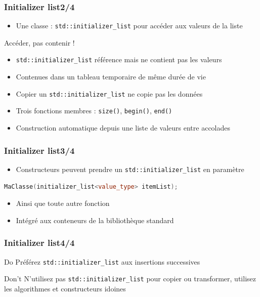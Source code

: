 \documentclass[C++.tex]{subfiles}
\begin{document}
\begin{frame}[fragile]
	\frametitle{Initializer list\titlehfill{}2/4}
	\begin{itemize}
		\item Une classe : \lstinline|std::initializer_list| pour accéder aux valeurs de la liste
	\end{itemize}

	\begin{alertblock}{Accéder, pas contenir !}
		\begin{itemize}
			\item \lstinline|std::initializer_list| référence mais ne contient pas les valeurs
			\item Contenues dans un tableau temporaire de même durée de vie
			\item Copier un \lstinline|std::initializer_list| ne copie pas les données
		\end{itemize}
	\end{alertblock}		

	\begin{itemize}
		\item Trois fonctions membres : \lstinline|size()|, \lstinline|begin()|, \lstinline|end()|
		\item Construction automatique depuis une liste de valeurs entre accolades
	\end{itemize}
\end{frame}

\begin{frame}[fragile]
	\frametitle{Initializer list\titlehfill{}3/4}
	\begin{itemize}
		\item Constructeurs peuvent prendre un \lstinline|std::initializer_list| en paramètre
	\end{itemize}

	\begin{lstlisting}[language=C++]
MaClasse(initializer_list<value_type> itemList);\end{lstlisting}

	\begin{itemize}
		\item Ainsi que toute autre fonction
		\item Intégré aux conteneurs de la bibliothèque standard
	\end{itemize}
\end{frame}

\begin{frame}[fragile]
\frametitle{Initializer list\titlehfill{}4/4}
	\begin{exampleblock}{Do}
		Préférez \lstinline|std::initializer_list| aux insertions successives
	\end{exampleblock}

	\pause

	\begin{alertblock}{Don't}
		N'utilisez pas \lstinline|std::initializer_list| pour copier ou transformer, utilisez les algorithmes et constructeurs idoines

	\end{alertblock}
\end{frame}
\end{document}
